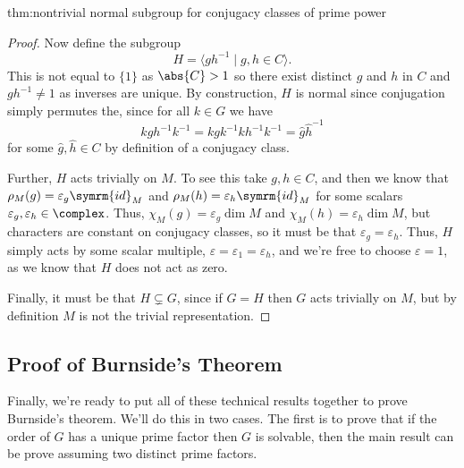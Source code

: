 \documentclass[fleqn]{NotesClass}
\newcommand{\id}{\symrm{id}}
\begin{document}
\begin{thm}{}{thm:nontrivial normal subgroup for conjugacy classes of prime power}
\begin{proof}
            Now define the subgroup
            \begin{equation}
                H = \langle gh^{-1} \mid g, h \in C \rangle.
            \end{equation}
            This is not equal to \(\{1\}\) as \(\abs{C} > 1\) so there exist distinct \(g\) and \(h\) in \(C\) and \(gh^{-1} \ne 1\) as inverses are unique.
            By construction, \(H\) is normal since conjugation simply permutes the, since for all \(k \in G\) we have
            \begin{equation}
                kgh^{-1}k^{-1} = kgk^{-1}kh^{-1}k^{-1} = \hat{g}\hat{h}^{-1}
            \end{equation}
            for some \(\hat{g}, \hat{h} \in C\) by definition of a conjugacy class.
            
            Further, \(H\) acts trivially on \(M\).
            To see this take \(g, h \in C\), and then we know that \(\rho_M(g) = \varepsilon_g \id_M\) and \(\rho_M(h) = \varepsilon_h \id_M\) for some scalars \(\varepsilon_g, \varepsilon_h \in \complex\).
            Thus, \(\chi_M(g) = \varepsilon_g \dim M\) and \(\chi_M(h) = \varepsilon_h \dim M\), but characters are constant on conjugacy classes, so it must be that \(\varepsilon_g = \varepsilon_h\).
            Thus, \(H\) simply acts by some scalar multiple, \(\varepsilon = \varepsilon_1 = \varepsilon_h\), and we're free to choose \(\varepsilon = 1\), as we know that \(H\) does not act as zero.
            
            Finally, it must be that \(H \subsetneq G\), since if \(G = H\) then \(G\) acts trivially on \(M\), but by definition \(M\) is not the trivial representation.
        \end{proof}
    \end{thm}
    
    \subsection{Proof of Burnside's Theorem}
    Finally, we're ready to put all of these technical results together to prove Burnside's theorem.
    We'll do this in two cases.
    The first is to prove that if the order of \(G\) has a unique prime factor then \(G\) is solvable, then the main result can be prove assuming two distinct prime factors.
    
\end{document}

